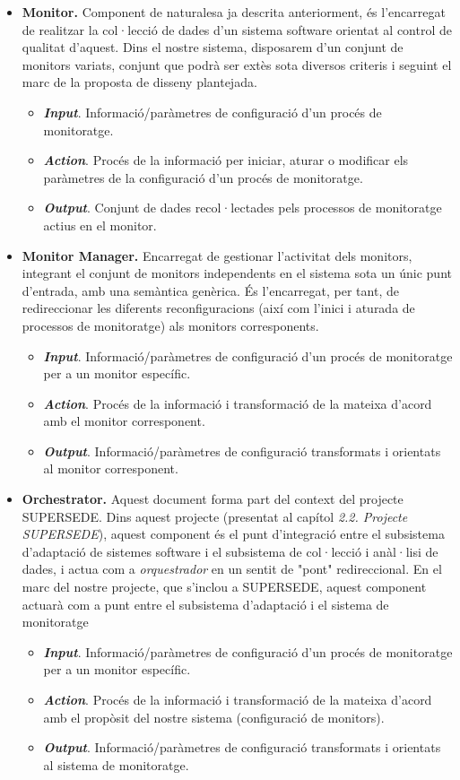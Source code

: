 \begin{itemize}
\item \textbf{Monitor.} Component de naturalesa ja descrita anteriorment, és l'encarregat de realitzar la col·lecció de dades d'un sistema software orientat al control de qualitat d'aquest. Dins el nostre sistema, disposarem d'un conjunt de monitors variats, conjunt que podrà ser extès sota diversos criteris i seguint el marc de la proposta de disseny plantejada.
\begin{itemize}
\item \textbf{\textit{Input}}. Informació/paràmetres de configuració d'un procés de monitoratge.
\item \textbf{\textit{Action}}. Procés de la informació per iniciar, aturar o modificar els paràmetres de la configuració d'un procés de monitoratge.
\item \textbf{\textit{Output}}. Conjunt de dades recol·lectades pels processos de monitoratge actius en el monitor.
\end{itemize}
\item \textbf{Monitor Manager.} Encarregat de gestionar l'activitat dels monitors, integrant el conjunt de monitors independents en el sistema sota un únic punt d'entrada, amb una semàntica genèrica. És l'encarregat, per tant, de redireccionar les diferents reconfiguracions (així com l'inici i aturada de processos de monitoratge) als monitors corresponents.
\begin{itemize}
\item \textbf{\textit{Input}}. Informació/paràmetres de configuració d'un procés de monitoratge per a un monitor específic.
\item \textbf{\textit{Action}}. Procés de la informació i transformació de la mateixa d'acord amb el monitor corresponent.
\item \textbf{\textit{Output}}. Informació/paràmetres de configuració transformats i orientats al monitor corresponent. 
\end{itemize}
\item \textbf{Orchestrator.} Aquest document forma part del context del projecte SUPERSEDE. Dins aquest projecte (presentat al capítol \textit{2.2. Projecte SUPERSEDE}), aquest component és el punt d'integració entre el subsistema d'adaptació de sistemes software i el subsistema de col·lecció i anàl·lisi de dades, i actua com a \textit{orquestrador} en un sentit de "pont" redireccional. En el marc del nostre projecte, que s'inclou a SUPERSEDE, aquest component actuarà com a punt entre el subsistema d'adaptació i el sistema de monitoratge
\begin{itemize}
\item \textbf{\textit{Input}}. Informació/paràmetres de configuració d'un procés de monitoratge per a un monitor específic.
\item \textbf{\textit{Action}}. Procés de la informació i transformació de la mateixa d'acord amb el propòsit del nostre sistema (configuració de monitors).
\item \textbf{\textit{Output}}. Informació/paràmetres de configuració transformats i orientats al sistema de monitoratge.
\end{itemize}
\end{itemize}

